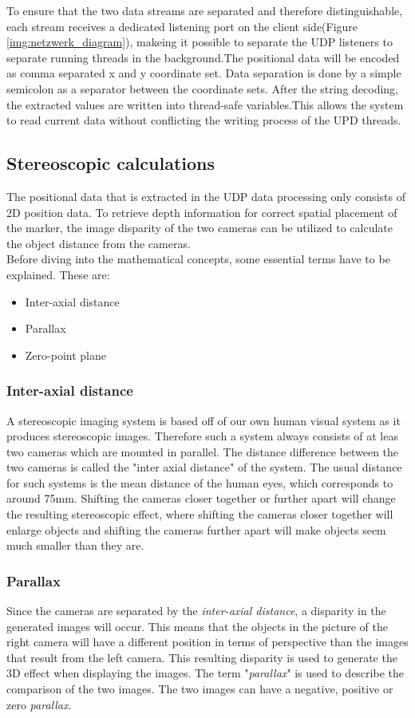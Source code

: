 To ensure that the two data streams are separated and therefore distinguishable, each stream receives a dedicated listening port on the client side(Figure \ref{img:netzwerk_diagram}), makeing it possible to separate the UDP listeners to separate running threads in the background.The positional data will be encoded as comma separated x and y coordinate set. Data separation is done by a simple semicolon as a separator between the coordinate sets. After the string decoding, the extracted values are written into thread-safe variables.This allows the system to read current data without conflicting the writing process of the UPD threads.
\subsection{Stereoscopic calculations}
The positional data that is extracted in the UDP data processing only consists of 2D position data. To retrieve depth information for correct spatial placement of the marker, the image disparity of the two cameras can be utilized to calculate the object distance from the cameras.\cite{Tauer.2010}\\
Before diving into the mathematical concepts, some essential terms have to be explained.
These are:
\begin{itemize}
\item Inter-axial distance
\item Parallax
\item Zero-point plane
\end{itemize}
\subsubsection{Inter-axial distance}
A stereoscopic imaging system is based off of our own human visual system as it produces stereoscopic images. Therefore such a system always consists of at leas two cameras which are mounted in parallel. The distance difference between the two cameras is called the "inter axial distance" of the system. The usual distance for such systems is the mean distance of the human eyes, which corresponds to around 75mm. Shifting the cameras closer together or further apart will change the resulting stereoscopic effect, where shifting the cameras closer together will enlarge objects and shifting the cameras further apart will make objects seem much smaller than they are. 
\subsubsection{Parallax}
Since the cameras are  separated by the \textit{inter-axial distance}, a disparity in the generated images will occur. This means that the objects in the picture of the right camera will have a different position in terms of perspective than the images that result from the left camera. This resulting disparity is used to generate the 3D effect when displaying the images. The term "\textit{parallax}" is used to describe the comparison of the two images. The two images can have a negative, positive or zero \textit{parallax}.
